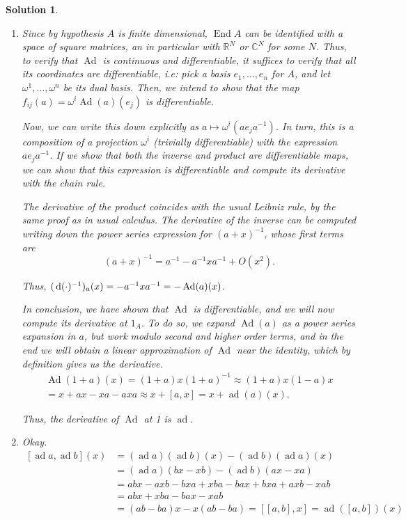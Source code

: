 \documentclass{article}
\theoremstyle{nonumberplain}
\newtheorem{sol}{Solution}
\newcommand{\R}{\mathbb{R}}
\newcommand{\C}{\mathbb{C}}
\DeclareMathOperator{\Ad}{Ad}
\DeclareMathOperator{\ad}{ad}
\DeclareMathOperator{\End}{End}
\begin{document}
\begin{sol}
\leavevmode
\begin{enumerate}
\item Since by hypothesis $A$ is finite dimensional, $\End A$ can be identified with a space of square matrices, an in particular with $\R^N$ or $\C^N$ for some $N$. Thus, to verify that $\Ad$ is continuous and differentiable, it suffices to verify that all its coordinates are differentiable, i.e: pick a basis $e_1, \dots, e_n$ for $A$, and let $\omega^1, \dots, \omega^n$ be its dual basis. Then, we intend to show that the map $f_{ij}(a) = \omega^i \Ad(a)(e_j)$ is differentiable.

Now, we can write this down explicitly as $a \mapsto \omega^i(a e_j a^{-1})$. In turn, this is a composition of a projection $\omega^i$ (trivially differentiable) with the expression $a e_j a^{-1}$. If we show that both the inverse and product are differentiable maps, we can show that this expression is differentiable and compute its derivative with the chain rule.

The derivative of the product coincides with the usual Leibniz rule, by the same proof as in usual calculus. The derivative of the inverse can be computed writing down the power series expression for $(a + x)^{-1}$, whose first terms are
\begin{equation}
(a+x)^{-1} = a^{-1} - a^{-1} x a^{-1} + O(x^2).
\end{equation}

Thus, $(\dl (\cdot)^{-1})_a(x) = -a^{-1} x a^{-1} = -\Ad(a)(x)$.

In conclusion, we have shown that $\Ad$ is differentiable, and we will now compute its derivative at $1_A$. To do so, we expand $\Ad(a)$ as a power series expansion in $a$, but work modulo second and higher order terms, and in the end we will obtain a linear approximation of $\Ad$ near the identity, which by definition gives us the derivative.
\begin{equation}
\begin{multlined}
\Ad(1+a)(x) = (1+a)x(1+a)^{-1} \approx (1+a) x (1 - a)x\\
= x + ax - xa - axa \approx x + [a,x] = x + \ad(a)(x).
\end{multlined}
\end{equation}

Thus, the derivative of $\Ad$ at 1 is $\ad$.

\item Okay.
\begin{equation}
\begin{aligned}
[\ad a, \ad b](x) &= (\ad a)(\ad b)(x) - (\ad b)(\ad a)(x)\\
&= (\ad a)(bx - xb) - (\ad b)(ax - xa)\\
&= abx - axb - bxa + xba - bax + bxa + axb - xab\\
&= abx + xba - bax - xab\\
&= (ab-ba)x - x(ab-ba) = [[a,b],x] = \ad([a,b])(x)
\end{aligned}
\end{equation}

\phantom{Bottom text.}
\end{enumerate}
\end{sol}
\end{document}
